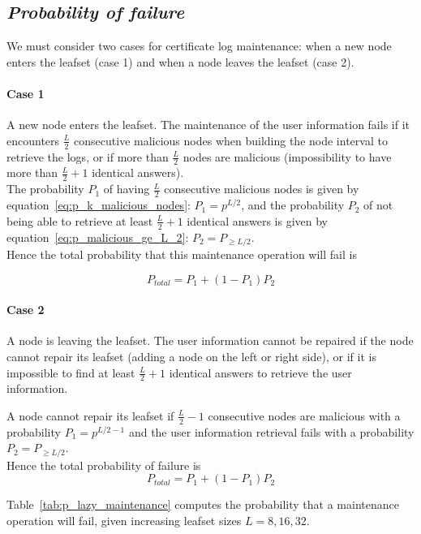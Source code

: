   \subsection{\textit{Probability of failure}}

    We must consider two cases for certificate log maintenance: when a new node
enters the leafset (case 1) and when a node leaves the leafset (case 2).

    \paragraph{\textbf{Case 1}} A new node enters the leafset. The maintenance
of the user information fails if it encounters $\frac{L}{2}$ consecutive
malicious nodes when building the node interval to retrieve the logs, or if
more than $\frac{L}{2}$ nodes are malicious (impossibility to have more than
$\frac{L}{2} +1$ identical answers).\\
    The probability $P_1$ of having $\frac{L}{2}$ consecutive malicious nodes
is given by equation~\ref{eq:p_k_malicious_nodes}: $P_1 = p^{L/2}$, and the
probability $P_2$ of not being able to retrieve at least $\frac{L}{2} +1$
identical answers is given by equation~\ref{eq:p_malicious_ge_L_2}: $P_2 =
P_{\ge L/2}$.\\
 Hence the total probability that this maintenance operation will
fail is

$$
  P_{total} = P_1 + (1-P_1) P_2
$$


    \paragraph{\textbf{Case 2}} A node is leaving the leafset. The user
information cannot be repaired if the node cannot repair its leafset (adding a
node on the left or right side), or if it is impossible to find at least
$\frac{L}{2} +1$ identical answers to retrieve the user information.

A node cannot repair its leafset if $\frac{L}{2} -1$ consecutive nodes are
malicious with a probability $P_1 = p^{L/2 - 1}$ and the user information
retrieval fails with a probability $P_2 = P_{\ge L/2}$.\\
Hence the total probability of failure is
$$
  P_{total} = P_1 + (1-P_1)P_2
$$

Table~\ref{tab:p_lazy_maintenance} computes the probability that a maintenance
operation will fail, given increasing leafset sizes $L = {8,16,32}$.


